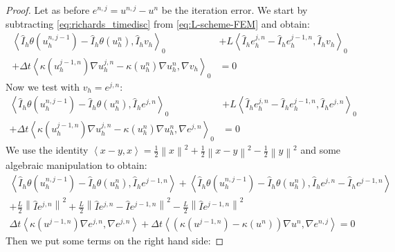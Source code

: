 \documentclass[../Main/main.tex]{subfiles}
\begin{document}
	\begin{proof}
		Let as before $e^{n,j} = u^{n,j}-u^n$ be the iteration error.
		We start by subtracting \eqref{eq:richards_timedisc} from \eqref{eq:L-scheme-FEM} and obtain:
			\begin{equation}
			\begin{aligned}
				\left \langle \hat{I}_h \theta(u^{n,j-1}_h) - \hat{I}_h \theta(u^{n}_h),\hat{I}_h v_h \right \rangle_0 &+ L \left \langle \hat{I}_h e^{j,n}_h -  \hat{I}_h e^{j-1,n}_h,\hat{I}_h v_h \right \rangle_0 \\+ \Delta t \left \langle \kappa(u_h^{j-1,n})\nabla u^{j,n}_h-\kappa(u_h^{n})\nabla u^{n}_h,\nabla v_h \right \rangle_0 &=0 
			\end{aligned}
		\end{equation}
		Now we test with $v_h=e^{j,n}$:
		\begin{equation}
			\begin{aligned}
				\left \langle \hat{I}_h \theta(u^{n,j-1}_h) - \hat{I}_h \theta(u^{n}_h),\hat{I}_h e^{j,n} \right \rangle_0 &+ L \left \langle \hat{I}_h e^{j,n}_h -  \hat{I}_h e^{j-1,n}_h,\hat{I}_h e^{j,n} \right \rangle_0 \\+ \Delta t \left \langle \kappa(u_h^{j-1,n})\nabla u^{j,n}_h-\kappa(u_h^{n})\nabla u^{n}_h,\nabla e^{j,n} \right \rangle_0 &=0 
			\end{aligned}
		\end{equation}
		We use the identity $\left \langle x-y,x\right \rangle = \frac{1}{2}\left \| x \right \|^2 + \frac{1}{2}\left \| x-y \right \|^2 - \frac{1}{2} \left \| y \right \|^2$ and some algebraic manipulation to obtain:
		\begin{equation}
			\begin{gathered}
					\left \langle \hat{I}_h \theta(u^{n,j-1}_h) - \hat{I}_h \theta(u^{n}_h),\hat{I}_h e^{j-1,n} \right \rangle + 	\left \langle \hat{I}_h \theta(u^{n,j-1}_h) - \hat{I}_h \theta(u^{n}_h),\hat{I}_h e^{j,n} - \hat{I}_h e^{j-1,n}\right \rangle \\
					+\frac{L}{2}\left \| \hat{I} e^{j,n}\right \|^2 + \frac{L}{2}\left \| \hat{I} e^{j,n}-\hat{I}e^{j-1,n} \right \|^2 -\frac{L}{2}\left \| \hat{I} e^{j-1,n}\right \|^2 \\
					\Delta t \left \langle \kappa(u^{j-1,n}) \nabla e^{j,n}, \nabla e^{j,n} \right \rangle + \Delta t \left \langle (\kappa(u^{j-1,n})-\kappa(u^n))\nabla u^n,\nabla e^{n,j}\right \rangle = 0 
			\end{gathered}
		\end{equation}
		Then we put some terms on the right hand side:

\end{proof}
\end{document}
